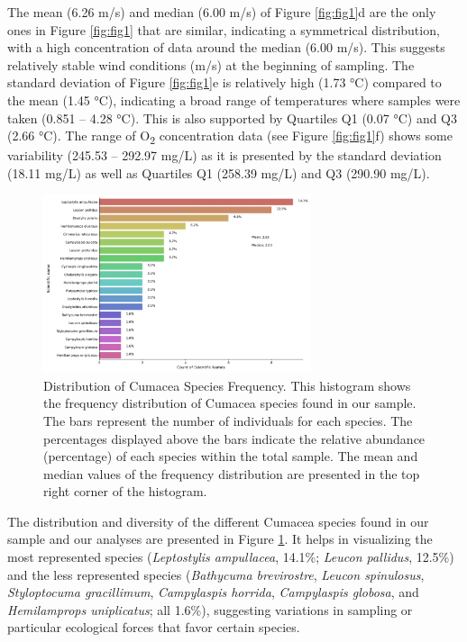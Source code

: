 The mean (6.26 m/s) and median (6.00 m/s) of Figure \ref{fig:fig1}d are the only ones in Figure \ref{fig:fig1} that are similar, indicating a symmetrical distribution, with a high concentration of data around the median (6.00 m/s). This suggests relatively stable wind conditions (m/s) at the beginning of sampling. The standard deviation of Figure \ref{fig:fig1}e is relatively high (1.73 °C) compared to the mean (1.45 °C), indicating a broad range of temperatures where samples were taken (0.851 – 4.28 °C). This is also supported by Quartiles Q1 (0.07 °C) and Q3 (2.66 °C). The range of O\textsubscript{2} concentration data (see Figure \ref{fig:fig1}f) shows some variability (245.53 – 292.97 mg/L) as it is presented by the standard deviation (18.11 mg/L) as well as Quartiles Q1 (258.39 mg/L) and Q3 (290.90 mg/L).

\begin{figure}[htbp]
    \centering
    \includegraphics[width=0.7\textwidth]{figure2.jpg}
    \caption{Distribution of Cumacea Species Frequency. This histogram shows the frequency distribution of Cumacea species found in our sample. The bars represent the number of individuals for each species. The percentages displayed above the bars indicate the relative abundance (percentage) of each species within the total sample. The mean and median values of the frequency distribution are presented in the top right corner of the histogram. \label{fig:fig2}}
\end{figure}

The distribution and diversity of the different Cumacea species found in our sample and our analyses are presented in Figure \ref{fig:fig2}. It helps in visualizing the most represented species (\emph{Leptostylis ampullacea}, 14.1\%; \emph{Leucon pallidus}, 12.5\%) and the less represented species (\emph{Bathycuma brevirostre}, \emph{Leucon spinulosus}, \emph{Styloptocuma gracillimum}, \emph{Campylaspis horrida}, \emph{Campylaspis globosa}, and \emph{Hemilamprops uniplicatus}; all 1.6\%), suggesting variations in sampling or particular ecological forces that favor certain species.

